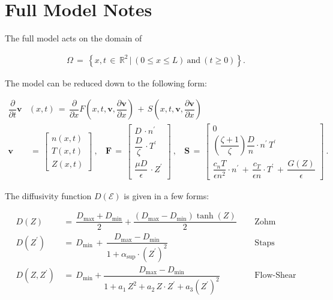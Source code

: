 \documentclass[a4paper,8pt]{article}
\date{}
\begin{document}
\section{Full Model Notes}\label{full-model-notes}

The full model acts on the domain of

\begin{align}
    \Omega \,=\, \left\{x, t \,\in\, \mathbb{R}^2 \,|\, (0 \leq x \leq L) ~\text{and}~ (t \geq 0)\right\}.
\end{align}

The model can be reduced down to the following form:

\begin{align}
    \dfrac{\partial}{\partial t} \mathbf{v}&(x,t) \,=\, \dfrac{\partial}{\partial x} F\left(x, t, \mathbf{v}, \dfrac{\partial\mathbf{v}}{\partial x}\right) \,+\, S\left(x, t, \mathbf{v}, \dfrac{\partial\mathbf{v}}{\partial x}\right) \\
\mathbf{v}& \,=\,\begin{bmatrix} n(x, t) \\ T(x, t) \\ Z(x, t) \end{bmatrix}~,~~~~
\mathbf{F} \,=\, \begin{bmatrix}
            D\,\cdot n^\prime \\[1ex]
            \dfrac{D}{\zeta}\,\cdot T^\prime \\[2ex]
            \dfrac{\mu D}{\epsilon}\,\cdot Z^\prime
            \end{bmatrix}~,~~~~
\mathbf{S} \,=\, \begin{bmatrix}
            0 \\[1ex]
            \left(\dfrac{\zeta + 1}{\zeta}\right) \dfrac{D}{n} \cdot n^\prime \, T^\prime \\[2ex]
            \dfrac{c_n T}{\epsilon n^2} \cdot n^\prime \,+\, \dfrac{c_T}{\epsilon n} \cdot T^\prime \,+\, \dfrac{G(Z)}{\epsilon}
            \end{bmatrix}~.
\end{align}

The diffusivity function \(D(\mathcal{E})\) is given in a few forms:

\begin{align}
    D(Z) \,&=\, \dfrac{D_\text{max} + D_\text{min}}{2} + \dfrac{(D_\text{max} - D_\text{min})\tanh(Z)}{2} ~~~~~~ &\text{Zohm} \\
    D(Z^\prime) \,&=\, D_\text{min} \,+\, \dfrac{D_\text{max} - D_\text{min}}{1 + \alpha_\text{sup}\cdot(Z^\prime)^2} ~~~~~~ &\text{Staps} \\
    D(Z, Z^\prime) \,&=\, D_\text{min} + \dfrac{D_\text{max} - D_\text{min}}{1 + a_1\,Z^2 + a_2\,Z \cdot Z^\prime + a_3\left(Z^\prime\right)^2} ~~~~~~ &\text{Flow-Shear}
\end{align}
\end{document}
